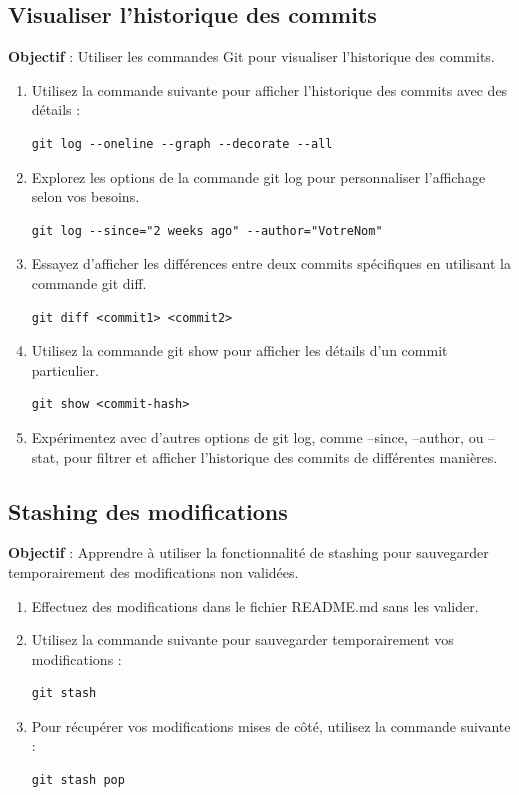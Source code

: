 \subsection*{Visualiser l'historique des commits}
{}
\noindent \textbf{Objectif} : Utiliser les commandes Git pour visualiser l'historique des commits.

\begin{enumerate}
	\item Utilisez la commande suivante pour afficher l'historique des commits avec des détails :
	\begin{verbatim}
git log --oneline --graph --decorate --all
	\end{verbatim}
	\item Explorez les options de la commande git log pour personnaliser l'affichage selon vos besoins.
	\begin{verbatim}
git log --since="2 weeks ago" --author="VotreNom"		
	\end{verbatim}
	\item Essayez d'afficher les différences entre deux commits spécifiques en utilisant la commande git diff.
	\begin{verbatim}
git diff <commit1> <commit2>
	\end{verbatim}
	\item Utilisez la commande git show pour afficher les détails d'un commit particulier.
	\begin{verbatim}
git show <commit-hash>
	\end{verbatim}
	\item Expérimentez avec d'autres options de git log, comme --since, --author, ou --stat, pour filtrer et afficher l'historique des commits de différentes manières.
\end{enumerate}

\subsection*{Stashing des modifications}
{}
\noindent \textbf{Objectif} : Apprendre à utiliser la fonctionnalité de stashing pour sauvegarder temporairement des modifications non validées.

\begin{enumerate}
	\item Effectuez des modifications dans le fichier README.md sans les valider.
	\item Utilisez la commande suivante pour sauvegarder temporairement vos modifications :
	\begin{verbatim}
git stash
	\end{verbatim}
	\item Pour récupérer vos modifications mises de côté, utilisez la commande suivante :
	\begin{verbatim}
git stash pop
	\end{verbatim}
\end{enumerate}

